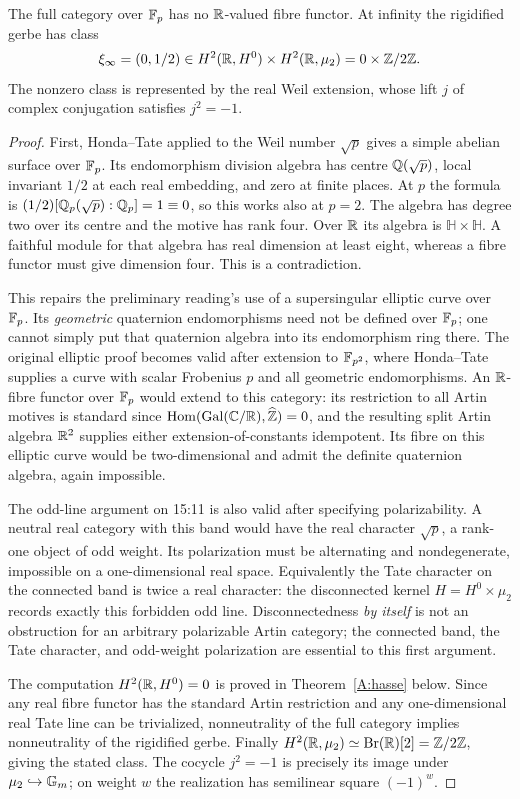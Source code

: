 \begin{proposition}
\label{A:real}
The full category over $\mathbb F_p$ has no $\mathbb R$-valued fibre functor.
At infinity the rigidified gerbe has class
\[
 \xi_\infty=(0,1/2)\in
 H^2(\mathbb R,H^0)\times H^2(\mathbb R,\mu_2)=0\times\mathbb Z/2\mathbb Z.
\]
The nonzero class is represented by the real Weil extension,
whose lift $j$ of complex conjugation satisfies $j^2=-1$.
\end{proposition}
\begin{proof}
First, Honda--Tate applied to the Weil number $\sqrt p$ gives a
simple abelian surface over $\mathbb F_p$. Its endomorphism division
algebra has centre $\mathbb Q(\sqrt p)$, local invariant $1/2$ at
each real embedding, and zero at finite places. At $p$ the formula
is $(1/2)[\mathbb Q_p(\sqrt p):\mathbb Q_p]=1\equiv0$, so this works also
at $p=2$. The algebra has degree two over its centre and the
motive has rank four. Over $\mathbb R$ its algebra is
$\mathbb H\times\mathbb H$. A faithful module for that algebra
has real dimension at least eight, whereas a fibre functor must
give dimension four. This is a contradiction.

This repairs the preliminary reading's use of a supersingular
elliptic curve over $\mathbb F_p$. Its \emph{geometric} quaternion
endomorphisms need not be defined over $\mathbb F_p$; one cannot simply
put that quaternion algebra into its endomorphism ring there.
The original elliptic proof becomes valid after extension to
$\mathbb F_{p^2}$, where Honda--Tate supplies a curve with scalar
Frobenius $p$ and all geometric endomorphisms. An $\mathbb R$-fibre
functor over $\mathbb F_p$ would extend to this category: its restriction
to all Artin motives is standard since
$\operatorname{Hom}(\operatorname{Gal}(\mathbb C/\mathbb R),\widehat{\mathbb Z})=0$, and the resulting split
Artin algebra $\mathbb R^2$ supplies either extension-of-constants
idempotent. Its fibre on this elliptic curve would be two-dimensional
and admit the definite quaternion algebra, again impossible.

The odd-line argument on 15:11 is also valid after specifying
polarizability. A neutral real category with this band would have
the real character $\sqrt p$, a rank-one object of odd weight.
Its polarization must be alternating and nondegenerate, impossible
on a one-dimensional real space. Equivalently the Tate character
on the connected band is twice a real character: the disconnected
kernel $H=H^0\times\mu_2$ records exactly this forbidden odd
line. Disconnectedness \emph{by itself} is not an obstruction for
an arbitrary polarizable Artin category; the connected band, the
Tate character, and odd-weight polarization are essential to this
first argument.

The computation $H^2(\mathbb R,H^0)=0$ is proved in
Theorem~\ref{A:hasse} below. Since any real fibre functor has the
standard Artin restriction and any one-dimensional real Tate line
can be trivialized, nonneutrality of the full category implies
nonneutrality of the rigidified gerbe. Finally
$H^2(\mathbb R,\mu_2)\simeq\operatorname{Br}(\mathbb R)[2]=\mathbb Z/2\mathbb Z$, giving the stated
class. The cocycle $j^2=-1$ is precisely its image under
$\mu_2\hookrightarrow{\mathbb G_m}$; on weight $w$ the realization has
semilinear square $(-1)^w$.
\end{proof}


